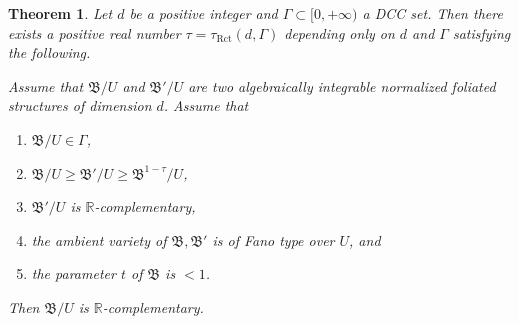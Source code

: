\documentclass[11pt,reqno]{amsart}
\numberwithin{equation}{section}
\newcommand{\Rct}{\operatorname{Rct}}
\newcommand{\Bb}{{\mathfrak{B}}}
\newcommand{\Ii}{\Gamma}
\newtheorem{thm}{Theorem}[section]
\theoremstyle{definition}
\begin{document}
\begin{thm}\label{thm: rct general}
Let $d$ be a positive integer and $\Ii\subset [0,+\infty)$ a DCC set. Then there exists a positive real number $\tau=\tau_{\Rct}(d,\Ii)$ depending only on $d$ and $\Ii$ satisfying the following. 

Assume that $\Bb/U$ and $\Bb'/U$ are two algebraically integrable normalized foliated structures of dimension $d$. Assume that
\begin{enumerate}
    \item $\Bb/U\in\Ii$,
    \item $\Bb/U\geq\Bb'/U\geq\Bb^{1-\tau}/U$, 
    \item $\Bb'/U$ is $\mathbb R$-complementary,
    \item the ambient variety of $\Bb,\Bb'$ is of Fano type over $U$, and
    \item the parameter $t$ of $\Bb$ is $<1$.
\end{enumerate}
Then $\Bb/U$ is $\mathbb R$-complementary.
\end{thm}
\end{document}
